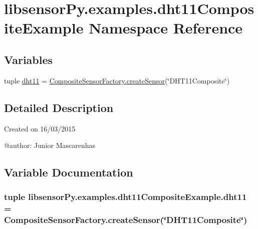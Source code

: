 \hypertarget{namespacelibsensorPy_1_1examples_1_1dht11CompositeExample}{}\section{libsensor\+Py.\+examples.\+dht11\+Composite\+Example Namespace Reference}
\label{namespacelibsensorPy_1_1examples_1_1dht11CompositeExample}
\subsection*{Variables}
\begin{DoxyCompactItemize}
\item 
tuple \hyperlink{namespacelibsensorPy_1_1examples_1_1dht11CompositeExample_a3c17838402251073a491f1cfbe8570f3}{dht11} = \hyperlink{classconcretefactory_1_1compositeSensorFactory_1_1CompositeSensorFactory_a2d3860525907a2f2d37c98163150ea03}{Composite\+Sensor\+Factory.\+create\+Sensor}(\char`\"{}D\+H\+T11\+Composite\char`\"{})
\end{DoxyCompactItemize}


\subsection{Detailed Description}
\begin{DoxyVerb}Created on 16/03/2015

@author: Junior Mascarenhas
\end{DoxyVerb}
 

\subsection{Variable Documentation}
\hypertarget{namespacelibsensorPy_1_1examples_1_1dht11CompositeExample_a3c17838402251073a491f1cfbe8570f3}{}
\subsubsection[{dht11}]{\setlength{\rightskip}{0pt plus 5cm}tuple libsensor\+Py.\+examples.\+dht11\+Composite\+Example.\+dht11 = {\bf Composite\+Sensor\+Factory.\+create\+Sensor}(\char`\"{}D\+H\+T11\+Composite\char`\"{})}\label{namespacelibsensorPy_1_1examples_1_1dht11CompositeExample_a3c17838402251073a491f1cfbe8570f3}
